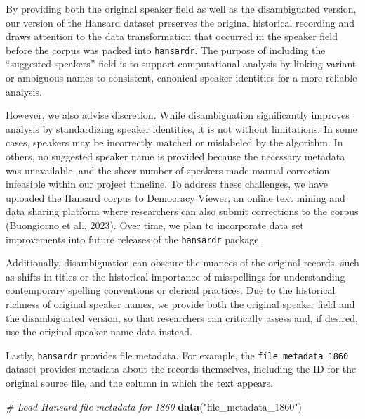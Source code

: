 \documentclass[
]{article}
\newenvironment{Shaded}{\begin{snugshade}}{\end{snugshade}}
\newcommand{\CommentTok}[1]{\textcolor[rgb]{0.56,0.35,0.01}{\textit{#1}}}
\newcommand{\FunctionTok}[1]{\textcolor[rgb]{0.13,0.29,0.53}{\textbf{#1}}}
\newcommand{\NormalTok}[1]{#1}
\newcommand{\StringTok}[1]{\textcolor[rgb]{0.31,0.60,0.02}{#1}}
\begin{document}
By providing both the original speaker field as well as the
disambiguated version, our version of the Hansard dataset preserves the
original historical recording and draws attention to the data
transformation that occurred in the speaker field before the corpus was
packed into \texttt{hansardr}. The purpose of including the ``suggested
speakers'' field is to support computational analysis by linking variant
or ambiguous names to consistent, canonical speaker identities for a
more reliable analysis.

However, we also advise discretion. While disambiguation significantly
improves analysis by standardizing speaker identities, it is not without
limitations. In some cases, speakers may be incorrectly matched or
mislabeled by the algorithm. In others, no suggested speaker name is
provided because the necessary metadata was unavailable, and the sheer
number of speakers made manual correction infeasible within our project
timeline. To address these challenges, we have uploaded the Hansard
corpus to Democracy Viewer, an online text mining and data sharing
platform where researchers can also submit corrections to the corpus
(Buongiorno et al., 2023). Over time, we plan to incorporate data set
improvements into future releases of the \texttt{hansardr} package.

Additionally, disambiguation can obscure the nuances of the original
records, such as shifts in titles or the historical importance of
misspellings for understanding contemporary spelling conventions or
clerical practices. Due to the historical richness of original speaker
names, we provide both the original speaker field and the disambiguated
version, so that researchers can critically assess and, if desired, use
the original speaker name data instead.

Lastly, \texttt{hansardr} provides file metadata. For example, the
\texttt{file\_metadata\_1860} dataset provides metadata about the
records themselves, including the ID for the original source file, and
the column in which the text appears.

\begin{Shaded}
\begin{Highlighting}[]
\CommentTok{\# Load Hansard file metadata for 1860 }
\FunctionTok{data}\NormalTok{(}\StringTok{"file\_metadata\_1860"}\NormalTok{)}
\end{Highlighting}
\end{Shaded}
\end{document}
